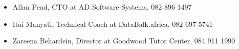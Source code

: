 \documentclass[a4paper]{twentysecondcv} %
\begin{document}
\begin{itemize}
    \item Allan Pead, CTO at AD Software Systems, 082 896 1497
    \item Itai Manyati, Technical Coach at DataBalk.africa, 082 697 5741
    \item Zareena Behardein, Director at Goodwood Tutor Center, 084 911 1990
    
\end{itemize}










\end{document}
